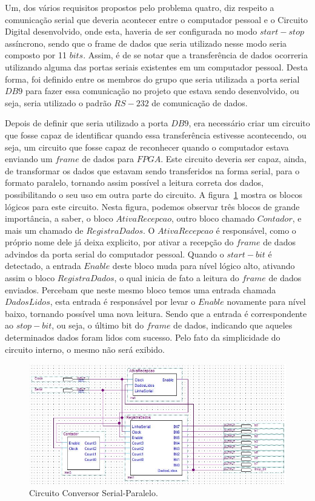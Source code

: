 \documentclass[12pt]{article}
\begin{document}
Um, dos vários requisitos propostos pelo problema quatro, diz respeito a comunicação serial que deveria acontecer entre o computador pessoal e o Circuito Digital desenvolvido, onde esta, haveria de ser configurada no modo $start-stop$ assíncrono, sendo que o frame de dados que seria utilizado nesse modo seria composto por 11 $bits$. Assim, é de se notar que a transferência de dados ocorreria utilizando alguma das portas seriais existentes em um computador pessoal. Desta forma, foi definido entre os membros do grupo que seria utilizada a porta serial $DB9$ para fazer essa comunicação no projeto que estava sendo desenvolvido, ou seja, seria utilizado o padrão $RS-232$ de comunicação de dados.

Depois de definir que seria utilizado a porta $DB9$, era necessário criar um circuito que fosse capaz de identificar quando essa transferência estivesse acontecendo, ou seja, um circuito que fosse capaz de reconhecer quando o computador estava enviando um $frame$ de dados para $FPGA$. Este circuito deveria ser capaz, ainda, de transformar os dados que estavam sendo transferidos na forma serial, para o formato paralelo, tornando assim possível a leitura correta dos dados, possibilitando o seu uso em outra parte do circuito. A figura~\ref{fig:aa2} mostra os blocos lógicos para este circuito. Nesta figura, podemos observar três blocos de grande importância, a saber, o bloco $AtivaRecepcao$, outro bloco chamado $Contador$, e mais um chamado  de $RegistraDados$. O $AtivaRecepcao$ é responsável, como o próprio nome dele já deixa explicito, por ativar a recepção do $frame$ de dados advindos da porta serial do computador pessoal. Quando o $start-bit$ é detectado, a entrada $Enable$ deste bloco muda para nível lógico alto, ativando assim o bloco $RegistraDados$, o qual inicia de fato a leitura do $frame$ de dados enviados. Percebam que neste mesmo bloco temos uma entrada chamada $DadosLidos$, esta entrada é responsável por levar o $Enable$ novamente para nível baixo, tornando possível uma nova leitura. Sendo que a entrada é correspondente ao $stop-bit$, ou seja, o último bit do $frame$ de dados, indicando que aqueles determinados dados foram lidos com sucesso. Pelo fato da simplicidade do circuito interno, o mesmo não será exibido. 


\begin{figure}[h]
\centering
\includegraphics[width=1\textwidth]{img/aa2.jpg}
\caption{Circuito Conversor Serial-Paralelo.}
\label{fig:aa2}
\end{figure}
\end{document}
